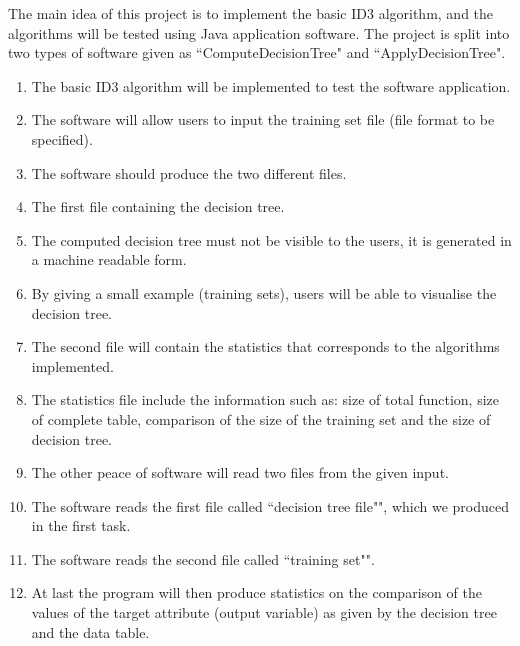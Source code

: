 \documentclass{report}
\begin{document}
The main idea of this project is to implement the basic ID3 algorithm, and the algorithms will be tested using Java application software. The project is split into two types of software given as ``ComputeDecisionTree" and ``ApplyDecisionTree". 

    
\begin{enumerate}


\item The basic ID3 algorithm will be implemented to test the software application.

\item The software will allow users to input the training set file (file format to be specified).
   
\item The software should produce the two different files.
  
\item The first file containing the decision tree.

\item The computed decision tree must not be visible to the users, it is generated in a machine readable form. 
	
\item By giving a small example (training sets), users will be able to visualise the decision tree. 
	
\item The second file will contain the statistics that corresponds to the algorithms implemented.
	
\item The statistics file include the information such as: size of total function, size of complete table, comparison of the size of the training set and the size of decision tree.
	
\item The other peace of software will read two files from the given input.

\item The software reads the first file called ``decision tree file"", which we produced in the first task.

\item The software reads the second file called ``training set"".
	
\item At last the program will then produce statistics on the comparison of the values of the target attribute (output variable) as given by the decision tree and the data table.

\end{enumerate}





\end{document}
